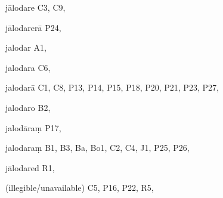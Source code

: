 \begin{ekdosis}
\begin{marma}[hp01_055]
\begin{marma}[hp02_009]
\begin{marma}[hp02_011]
\begin{marma}[hp02_49b]
  \begin{description}

    \end{description}
 \end{marma}

\begin{marma}[hp02_53a]
\item[jālodare] C3, C9,  
\item[jālodarerā] P24, 
\item[jalodar] A1,
\item[jalodara] C6,
\item[jalodarā] C1, C8, P13, P14, P15, P18, P20, P21, P23, P27, 
\item[jalodaro] B2,
\item[jalodāraṃ] P17,
\item[jalodaraṃ] B1, B3, Ba, Bo1, C2, C4, J1, P25, P26, 
\item[jālodared] R1,
\item[(illegible/unavailable)] C5, P16, P22, R5,

  \begin{description}

    \end{description}
 \end{marma}



\end{marma}
\end{marma}
\end{marma}
\end{ekdosis}
